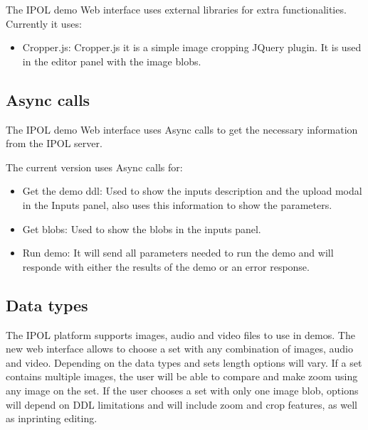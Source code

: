 The IPOL demo Web interface uses external libraries for extra functionalities.
Currently it uses:

\begin{itemize}
\item Cropper.js: Cropper.js it is a simple image cropping JQuery plugin. It is used in the editor panel with the image blobs.
\end{itemize}


\subsection{Async calls}
The IPOL demo Web interface uses Async calls to get the necessary information from the IPOL server.

The current version uses Async calls for:
\begin{itemize}
\item Get the demo ddl: Used to show the inputs description and the upload modal in the Inputs panel, also uses this information to show the parameters.
\item Get blobs: Used to show the blobs in the inputs panel.
\item Run demo: It will send all parameters needed to run the demo and will responde with either the results of the demo or an error response.
\end{itemize}


\subsection{Data types}
The IPOL platform supports images, audio and video files to use in demos. The new web interface 
allows to choose a set with any combination of images, audio and video. Depending on the data types and sets length options will vary. 
If a set contains multiple images, the user will be able to compare and make zoom using any image on the set. If the user chooses a set with only 
one image blob, options will depend on DDL limitations and will include zoom and crop features, as well as inprinting editing.
